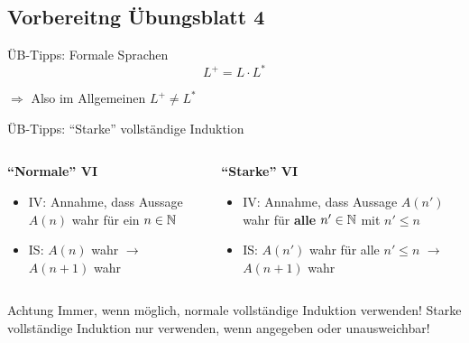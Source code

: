 \subsection{Vorbereitng Übungsblatt 4}
\begin{frame}{ÜB-Tipps: Formale Sprachen}
    \[
    	L^+ = L \cdot L^*
    \]

    \bigskip

    \centering $\Rightarrow$ Also im Allgemeinen $L^+ \ne L^*$
\end{frame}

\begin{frame}{ÜB-Tipps: \enquote{Starke} vollständige Induktion}
	\begin{columns}

		\begin{column}[t]{.5\textwidth}
			\textbf{\enquote{Normale} VI}
			\begin{itemize}
				\item IV: Annahme, dass Aussage $A(n)$ wahr für ein $n \in  \mathbb{N}$
				\item IS: $A(n)$ wahr $\rightarrow$ $A(n+1)$ wahr
			\end{itemize}			
		\end{column}

		\begin{column}[t]{.5\textwidth}
			\textbf{\enquote{Starke} VI}
			\begin{itemize}
				\item IV: Annahme, dass Aussage $A(n')$ wahr für \textbf{alle} $n' \in \mathbb{N}$ mit $n' \le n$
				\item IS: $A(n')$ wahr für alle $n' \le n$ $\rightarrow$ $A(n+1)$ wahr
			\end{itemize}
		\end{column}
	
	\end{columns}

	\begin{alertblock}{Achtung}
		Immer, wenn möglich, normale vollständige Induktion verwenden! Starke vollständige Induktion nur verwenden, wenn angegeben oder unausweichbar!
	\end{alertblock}

\end{frame}